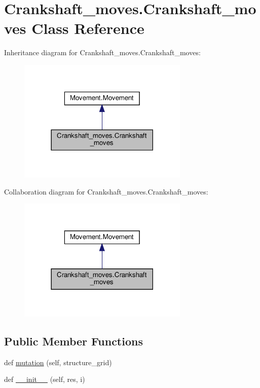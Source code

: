 \hypertarget{classCrankshaft__moves_1_1Crankshaft__moves}{}\section{Crankshaft\+\_\+moves.\+Crankshaft\+\_\+moves Class Reference}
\label{classCrankshaft__moves_1_1Crankshaft__moves}


Inheritance diagram for Crankshaft\+\_\+moves.\+Crankshaft\+\_\+moves\+:
\nopagebreak
\begin{figure}[H]
\begin{center}
\leavevmode
\includegraphics[width=230pt]{classCrankshaft__moves_1_1Crankshaft__moves__inherit__graph}
\end{center}
\end{figure}


Collaboration diagram for Crankshaft\+\_\+moves.\+Crankshaft\+\_\+moves\+:
\nopagebreak
\begin{figure}[H]
\begin{center}
\leavevmode
\includegraphics[width=230pt]{classCrankshaft__moves_1_1Crankshaft__moves__coll__graph}
\end{center}
\end{figure}
\subsection*{Public Member Functions}
\begin{DoxyCompactItemize}
\item 
def \hyperlink{classCrankshaft__moves_1_1Crankshaft__moves_a9373405d3071eedd7d35a92ecd1aa3af}{mutation} (self, structure\+\_\+grid)
\item 
def \hyperlink{classCrankshaft__moves_1_1Crankshaft__moves_a5f336d38f0adee71bf8d6c9a9c0b4d7e}{\+\_\+\+\_\+init\+\_\+\+\_\+} (self, res, i)
\end{DoxyCompactItemize}

